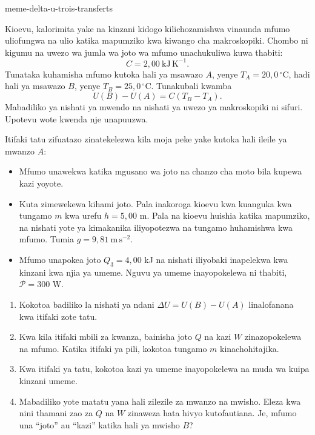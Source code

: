 \begin{exo}{meme-delta-u-trois-transferts}

Kioevu, kalorimita yake na kinzani kidogo kilichozamishwa vinaunda mfumo
uliofungwa na ulio katika mapumziko kwa kiwango cha makroskopiki. Chombo ni
kigumu na uwezo wa jumla wa joto wa mfumo unachukuliwa kuwa thabiti:
\[
C=2{,}00\ \mathrm{kJ\,K^{-1}}.
\]
Tunataka kuhamisha mfumo kutoka hali ya msawazo $A$, yenye
$T_A=20{,}0\,^\circ\mathrm{C}$, hadi hali ya msawazo $B$, yenye
$T_B=25{,}0\,^\circ\mathrm{C}$. Tunakubali kwamba
\[
U(B)-U(A)=C(T_B-T_A).
\]
Mabadiliko ya nishati ya mwendo na nishati ya uwezo ya makroskopiki ni sifuri.
Upotevu wote kwenda nje unapuuzwa.

Itifaki tatu zifuatazo zinatekelezwa kila moja peke yake kutoka hali ileile ya mwanzo $A$:
\begin{itemize}
\item[Itifaki ya 1] Mfumo unawekwa katika mgusano wa joto na chanzo cha moto bila kupewa kazi yoyote.
\item[Itifaki ya 2] Kuta zimewekewa kihami joto. Pala inakoroga kioevu kwa kuanguka kwa tungamo $m$ kwa urefu $h=5{,}00$ m. Pala na kioevu huishia katika mapumziko, na nishati yote ya kimakanika iliyopotezwa na tungamo huhamishwa kwa mfumo. Tumia $g=9{,}81\ \mathrm{m\,s^{-2}}$.
\item[Itifaki ya 3] Mfumo unapokea joto $Q_3=4{,}00$ kJ na nishati iliyobaki inapelekwa kwa kinzani kwa njia ya umeme. Nguvu ya umeme inayopokelewa ni thabiti, $\mathcal P=300$ W.
\end{itemize}

\begin{enumerate}
\item Kokotoa badiliko la nishati ya ndani $\Delta U=U(B)-U(A)$ linalofanana kwa itifaki zote tatu.
\item Kwa kila itifaki mbili za kwanza, bainisha joto $Q$ na kazi $W$ zinazopokelewa na mfumo. Katika itifaki ya pili, kokotoa tungamo $m$ kinachohitajika.
\item Kwa itifaki ya tatu, kokotoa kazi ya umeme inayopokelewa na muda wa kuipa kinzani umeme.
\item Mabadiliko yote matatu yana hali zilezile za mwanzo na mwisho. Eleza kwa nini thamani zao za $Q$ na $W$ zinaweza hata hivyo kutofautiana. Je, mfumo una “joto” au “kazi” katika hali ya mwisho $B$?
\end{enumerate}


\end{exo}
